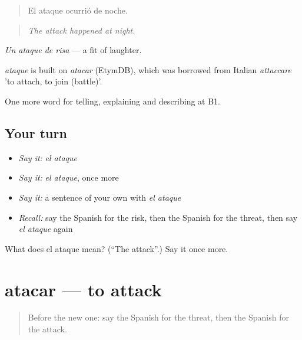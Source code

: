 \begin{quote}
El ataque ocurrió de noche.
\end{quote}

\begin{quote}
\emph{The attack happened at night.}
\end{quote}

\emph{Un ataque de risa} — a fit of laughter.

\begin{cousinweb}
\emph{ataque} is built on \emph{atacar} (EtymDB), which was borrowed from Italian \emph{attaccare} 'to attach, to join (battle)'.
\end{cousinweb}

\begin{grammarlens}[title={What you've built}]
One more word for telling, explaining and describing at B1.
\end{grammarlens}

\subsection*{Your turn}
\begin{itemize}
\raggedright
  \item \emph{Say it:} \emph{el ataque}
  \item \emph{Say it:} \emph{el ataque}, once more
  \item \emph{Say it:} a sentence of your own with \emph{el ataque}
  \item \emph{Recall:} say the Spanish for the risk, then the Spanish for the threat, then say \emph{el ataque} again
\end{itemize}

\begin{tcolorbox}[breakable,colback=teal!4,colframe=teal!35!black,title={Before you move on}]
What does el ataque mean? (\textquotedblleft{}The attack\textquotedblright{}.) Say it once more.
\end{tcolorbox}
\section[atacar]{atacar — to attack}

\label{lesson:ES-C530-atacar}



\begin{quote}
Before the new one: say the Spanish for the threat, then the Spanish for the attack.
\end{quote}


